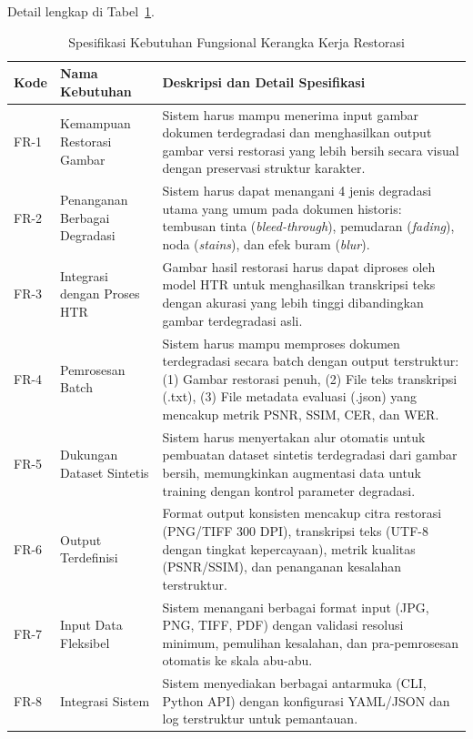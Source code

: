 \documentclass[12pt,a4paper]{article}
\begin{document}
Detail lengkap di Tabel~\ref{tab:functional_requirements}.

\begin{table}[htbp!]
\centering
\small
\caption{Spesifikasi Kebutuhan Fungsional Kerangka Kerja Restorasi}
\label{tab:functional_requirements}
\begin{tabular}{p{}p{}p{}}
\toprule
\textbf{Kode} & \textbf{Nama Kebutuhan} & \textbf{Deskripsi dan Detail Spesifikasi} \\
\midrule
FR-1 & Kemampuan Restorasi Gambar & Sistem harus mampu menerima input gambar dokumen terdegradasi dan menghasilkan output gambar versi restorasi yang lebih bersih secara visual dengan preservasi struktur karakter. \\
\midrule
FR-2 & Penanganan Berbagai Degradasi & Sistem harus dapat menangani 4 jenis degradasi utama yang umum pada dokumen historis: tembusan tinta (\textit{bleed-through}), pemudaran (\textit{fading}), noda (\textit{stains}), dan efek buram (\textit{blur}). \\
\midrule
FR-3 & Integrasi dengan Proses HTR & Gambar hasil restorasi harus dapat diproses oleh model HTR untuk menghasilkan transkripsi teks dengan akurasi yang lebih tinggi dibandingkan gambar terdegradasi asli. \\
\midrule
FR-4 & Pemrosesan Batch & Sistem harus mampu memproses dokumen terdegradasi secara batch dengan output terstruktur: (1) Gambar restorasi penuh, (2) File teks transkripsi (.txt), (3) File metadata evaluasi (.json) yang mencakup metrik PSNR, SSIM, CER, dan WER. \\
\midrule
FR-5 & Dukungan Dataset Sintetis & Sistem harus menyertakan alur otomatis untuk pembuatan dataset sintetis terdegradasi dari gambar bersih, memungkinkan augmentasi data untuk training dengan kontrol parameter degradasi. \\
\midrule
FR-6 & Output Terdefinisi & Format output konsisten mencakup citra restorasi (PNG/TIFF 300 DPI), transkripsi teks (UTF-8 dengan tingkat kepercayaan), metrik kualitas (PSNR/SSIM), dan penanganan kesalahan terstruktur. \\
\midrule
FR-7 & Input Data Fleksibel & Sistem menangani berbagai format input (JPG, PNG, TIFF, PDF) dengan validasi resolusi minimum, pemulihan kesalahan, dan pra-pemrosesan otomatis ke skala abu-abu. \\
\midrule
FR-8 & Integrasi Sistem & Sistem menyediakan berbagai antarmuka (CLI, Python API) dengan konfigurasi YAML/JSON dan log terstruktur untuk pemantauan. \\
\bottomrule
\end{tabular}
\end{table}
\end{document}
